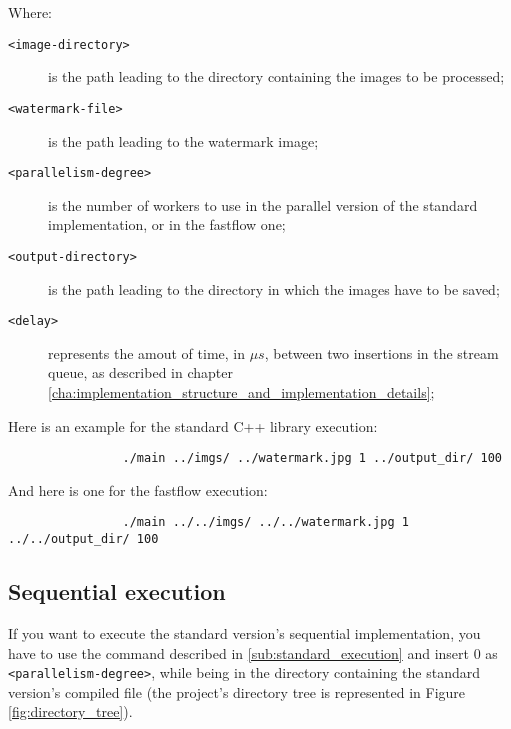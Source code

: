             Where:
            \begin{description}
                \item[\texttt{<image-directory>}] is the path leading to the directory containing the images to
                be processed;
                \item[\texttt{<watermark-file>}] is the path leading to the watermark image;
                \item[\texttt{<parallelism-degree>}] is the number of workers to use in the parallel version of
                the standard implementation, or in the fastflow one;
                \item[\texttt{<output-directory>}] is the path leading to the directory in which the images
                have to be saved;
                \item[\texttt{<delay>}] represents the amout of time, in $\mu s$, between two insertions in the
                stream queue, as described in chapter
                \ref{cha:implementation_structure_and_implementation_details};
            \end{description}
            Here is an example for the standard C++ library execution:

            \begin{verbatim}
                ./main ../imgs/ ../watermark.jpg 1 ../output_dir/ 100
            \end{verbatim}

            And here is one for the fastflow execution:

            \begin{verbatim}
                ./main ../../imgs/ ../../watermark.jpg 1 ../../output_dir/ 100
            \end{verbatim}
        \subsection{Sequential execution} %
        \label{sub:sequential_execution}
            If you want to execute the standard version's sequential implementation, you have to use the
            command described in \ref{sub:standard_execution} and insert $0$ as
            \texttt{<parallelism-degree>}, while being in the directory containing the standard version's
            compiled file (the project's directory tree is represented in Figure \ref{fig:directory_tree}).

